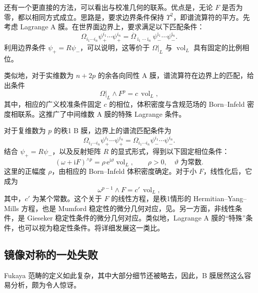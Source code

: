 还有一个更直接的方法，可以看出与校准几何的联系。优点是，无论 $F$ 是否为零，都以相同方式成立。思路是，要求边界条件保持 $\Upsilon^2$，即谱流算符的平方。先考虑 Lagrange A 膜。在世界面边界上，要求满足以下匹配条件：
\begin{equation}\label{eq:3.196}
\Omega_{i_1\cdots i_n}\psi_+^{i_1}\cdots\psi_+^{i_n}
=\overline{\Omega}_{\bar\imath_1\cdots\bar\imath_n}
\psi_-^{\bar\imath_1}\cdots\psi_-^{\bar\imath_n}.
\end{equation}
利用边界条件 $\psi_+=R\psi_-$，可以说明，这等价于 $\Omega|_L$ 与 $\operatorname{vol}_L$ 具有固定的比例相位。

类似地，对于实维数为 $n+2p$ 的余各向同性 A 膜，谱流算符在边界上的匹配，给出条件
\[
\Omega|_L\wedge F^p=c\,\operatorname{vol}_L,
\]
其中，相应的广义校准条件固定 $c$ 的相位，体积密度与含规范场的 Born--Infeld 密度相联系。这推广了中间维数 A 膜的特殊 Lagrange 条件。

对于复维数为 $p$ 的秩1 B 膜，边界上的谱流匹配条件为
\begin{equation}\label{eq:3.197}
\Omega_{i_1\cdots i_n}\psi_+^{i_1}\cdots\psi_+^{i_n}
=\Omega_{i_1\cdots i_n}\psi_-^{i_1}\cdots\psi_-^{i_n}.
\end{equation}
结合 $\psi_+=R\psi_-$，以及反射矩阵 $R$ 的显式形式，得到以下固定相位条件：
\begin{equation}\label{eq:3.198}
(\omega+\mathrm{i}F)^{\wedge p}
=\rho\,\mathrm{e}^{\mathrm{i}\vartheta}\operatorname{vol}_L,
\qquad\rho>0,\quad\vartheta\text{ 为常数}.
\end{equation}
这里的正幅度 $\rho$，由相应的 Born--Infeld 体积密度确定。对于小 $F$，线性化后，它成为
\[
\omega^{p-1}\wedge F=c'\,\operatorname{vol}_L,
\]
其中，$c'$ 为某个常数。这个关于 $F$ 的线性方程，是秩1情形的 Hermitian--Yang--Mills 方程，也是 Mumford 稳定性的微分几何对应，见。另一方面，非线性条件，是 Gieseker 稳定性条件的微分几何对应。类似地，Lagrange A 膜的“特殊”条件，也可以视为稳定性条件。将详细发展这一类比。

\subsection{镜像对称的一处失败}\label{sec:3.6.7}

Fukaya 范畴的定义如此复杂，其中大部分细节还被略去，因此，B 膜居然这么容易分析，颇为令人惊讶。

